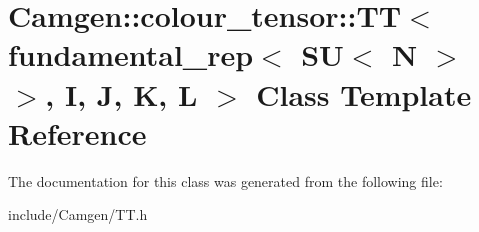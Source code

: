 \hypertarget{a00546}{}\section{Camgen\+:\+:colour\+\_\+tensor\+:\+:T\+T$<$ fundamental\+\_\+rep$<$ S\+U$<$ N $>$ $>$, I, J, K, L $>$ Class Template Reference}
\label{a00546}


The documentation for this class was generated from the following file\+:\begin{DoxyCompactItemize}
\item 
include/\+Camgen/T\+T.\+h\end{DoxyCompactItemize}
